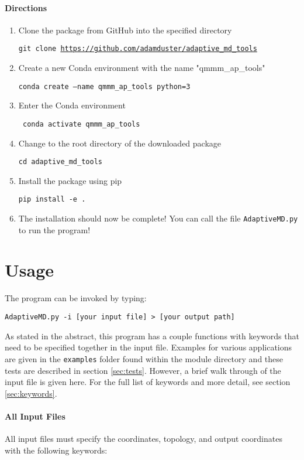 \documentclass{article}
\begin{document}
\paragraph{Directions}
\begin{enumerate}
\item Clone the package from GitHub into the specified directory

\texttt{git clone \url{https://github.com/adamduster/adaptive_md_tools}}

\item Create a new Conda environment with the name "qmmm\_ap\_tools"

\texttt{conda create --name qmmm\_ap\_tools python=3}

\item Enter the Conda environment

\texttt{ conda activate qmmm\_ap\_tools }

\item Change to the root directory of the downloaded package

\texttt{cd adaptive\_md\_tools}

\item Install the package using pip

\texttt{pip install -e .}

\item The installation should now be complete!
You can call the file \texttt{AdaptiveMD.py} to run the program!
\end{enumerate}

\section{Usage}
The program can be invoked by typing:

\texttt{AdaptiveMD.py -i [your input file] > [your output path]}

As stated in the abstract, this program has a couple functions with keywords that need to be specified together in the input file.
Examples for various applications are given in the \texttt{examples} folder found within the module directory and these tests are described in section \ref{sec:tests}.
However, a brief walk through of the input file is given here.
For the full list of keywords and more detail, see section \ref{sec:keywords}.

\paragraph{All Input Files}
All input files must specify the coordinates, topology, and output coordinates with the following keywords:
\end{document}
